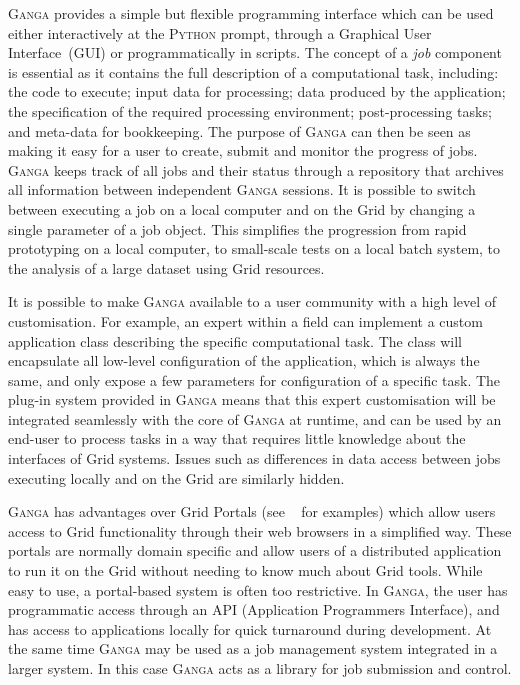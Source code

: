 \documentclass{elsart}
\def\ganga {\textsc{Ganga}\xspace}
\def\python {\textsc{Python}\xspace}
\def\grid {Grid\xspace}
\begin{document}
\ganga provides a simple but flexible programming interface which can
be used either interactively at the \python prompt, through a
Graphical User Interface~(GUI) or programmatically in scripts. The
concept of a \emph{job} component is essential as it contains the full
description of a computational task, including: the code to execute;
input data for processing; data produced by the application; the
specification of the required processing environment; post-processing
tasks; and meta-data for bookkeeping.  The purpose of \ganga can then
be seen as making it easy for a user to create, submit and monitor the
progress of jobs. \ganga keeps track of all jobs and their status
through a repository that archives all information between independent
\ganga sessions. It is possible to switch between executing a job on a
local computer and on the \grid by changing a single parameter of a job object. 
This simplifies the progression from rapid prototyping on a local
computer, to small-scale tests on a local batch system, to the analysis of a
large dataset using \grid resources.

It is possible to make \ganga available to a user community with a high level
of customisation. For example, an expert within a field can implement a custom
application class describing the specific computational task. The class will
encapsulate all low-level configuration of the application, which is always
the same, and only expose a few parameters for configuration of a specific
task. The plug-in system provided in \ganga means that this expert
customisation will be integrated seamlessly with the core of \ganga at runtime,
and can be used by an end-user to process tasks in a way that requires
little knowledge about the interfaces of \grid systems. Issues such as
differences in data access between jobs executing locally and on the
\grid are similarly hidden.

\ganga has advantages over \grid Portals (see ~\cite{AHE,LEAD} for
examples) which allow users access to \grid functionality through
their web browsers in a simplified way. These portals are normally
domain specific and allow users of a distributed application to run it
on the \grid without needing to know much about \grid tools. While
easy to use, a portal-based system is often too restrictive.  In
\ganga, the user has programmatic access through an API (Application
Programmers Interface), and has access to applications locally for
quick turnaround during development. At the same time \ganga may be
used as a job management system integrated in a larger system. In this
case \ganga acts as a library for job submission and control.
\end{document}
